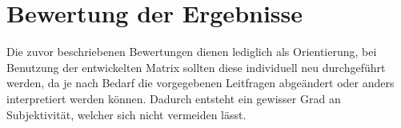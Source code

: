 \chapter{Bewertung der Ergebnisse}

Die zuvor beschriebenen Bewertungen dienen lediglich als Orientierung, 
bei Benutzung der entwickelten Matrix sollten diese individuell neu durchgeführt werden,
da je nach Bedarf die vorgegebenen Leitfragen abgeändert oder anders interpretiert werden können.
Dadurch entsteht ein gewisser Grad an Subjektivität, welcher sich nicht vermeiden lässt.